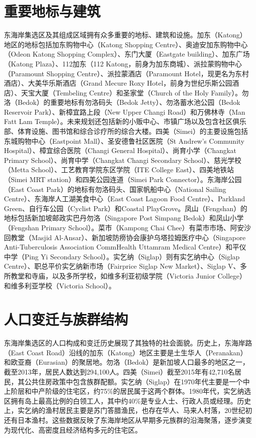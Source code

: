 \documentclass[11pt,a4paper,twoside,openany]{book}
\begin{document}
\section{重要地标与建筑}
东海岸集选区及其组成区域拥有众多重要的地标、建筑和设施。加东（Katong）地区的地标包括加东购物中心（Katong Shopping Centre）、奥迪安加东购物中心（Odeon Katong Shopping Complex）、东门大厦（Eastgate building）、加东广场（Katong Plaza）、112加东（112 Katong，前身为加东商城）、派拉蒙购物中心（Paramount Shopping Centre）、派拉蒙酒店（Paramount Hotel，现更名为东村酒店）、大美华乐斯酒店（Grand Mecure Roxy Hotel，前身为世纪乐斯公园酒店）、天宝大厦（Tembeling Centre）和圣家堂（Church of the Holy Family）。勿洛（Bedok）的重要地标有勿洛码头（Bedok Jetty）、勿洛蓄水池公园（Bedok Reservoir Park）、新樟宜路上段（New Upper Changi Road）和万佛林寺（Man Fatt Lam Temple）。未来规划还包括新的小贩中心、市镇广场以及包含社区俱乐部、体育设施、图书馆和综合诊疗所的综合大楼。四美（Simei）的主要设施包括东城购物中心（Eastpoint Mall）、圣安德鲁社区医院（St Andrew’s Community Hospital）、樟宜综合医院（Changi General Hospital）、尚育小学（Changkat Primary School）、尚育中学（Changkat Changi Secondary School）、慈光学校（Metta School）、工艺教育学院东区学院（ITE College East）、四美地铁站（Simei MRT station）和四美公园连道（Simei Park Connector）。东海岸公园（East Coast Park）的地标有勿洛码头、国家帆船中心（National Sailing Centre）、东海岸人工湖美食中心（East Coast Lagoon Food Centre）、Parkland Green、自行车公园（Cyclist Park）和Coastal PlayGrove。凤山（Fengshan）的地标包括新加坡邮政实巴丹勿洛（Singapore Post Simpang Bedok）和凤山小学（Fengshan Primary School）。菜市（Kampong Chai Chee）有菜市市场、阿安沙回教堂（Masjid Al-Ansar）、新加坡防痨协会康护乌塔拉姆医疗中心（Singapore Anti-Tuberculosis Association CommHealth Uttamram Medical Centre）和平仪中学（Ping Yi Secondary School）。实乞纳（Siglap）则有实乞纳中心（Siglap Centre）、职总平价实乞纳新市场（Fairprice Siglap New Market）、Siglap V、多所教堂和寺庙，以及多所学校，如维多利亚初级学院（Victoria Junior College）和维多利亚学校（Victoria School）。

\section{人口变迁与族群结构}
东海岸集选区的人口构成和变迁历史展现了其独特的社会面貌。历史上，东海岸路（East Coast Road）沿线的加东（Katong）地区主要是土生华人（Peranakan）和欧亚裔（Eurasian）的聚居地。勿洛（Bedok）是新加坡人口最多的地区之一，截至2013年，居民人数达到294,100人。四美（Simei）截至2015年有42,710名居民，其公共住房政策中包含族群配额。实乞纳（Siglap）在1970年代主要是一个中上阶层和中产阶级的住宅区，约75\%的居民属于这两个群体。1980年代，实乞纳选区拥有岛上最高比例的白领工人，其中约40\%是专业人士、行政人员或经理。历史上，实乞纳的渔村居民主要是苏门答腊渔民，也存在华人、马来人村落，20世纪初还有日本渔村。这些数据反映了东海岸地区从早期多元族群的沿海聚落，逐步演变为现代化、高密度且经济结构多元的住宅区。
\end{document}
